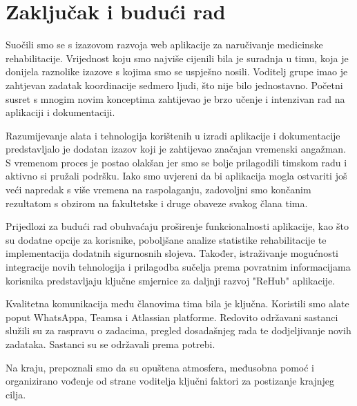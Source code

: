 \chapter{Zaključak i budući rad}
		
		Suočili smo se s izazovom razvoja web aplikacije za naručivanje medicinske rehabilitacije. Vrijednost koju smo najviše cijenili bila je suradnja u timu, koja je donijela raznolike izazove s kojima smo se uspješno nosili. Voditelj grupe imao je zahtjevan zadatak koordinacije sedmero ljudi, što nije bilo jednostavno. Početni susret s mnogim novim konceptima zahtijevao je brzo učenje i intenzivan rad na aplikaciji i dokumentaciji.

        Razumijevanje alata i tehnologija korištenih u izradi aplikacije i dokumentacije predstavljalo je dodatan izazov koji je zahtijevao značajan vremenski angažman. S vremenom proces je postao olakšan jer smo se bolje prilagodili timskom radu i aktivno si pružali podršku. Iako smo uvjereni da bi aplikacija mogla ostvariti još veći napredak s više vremena na raspolaganju, zadovoljni smo končanim rezultatom s obzirom na fakultetske i druge obaveze svakog člana tima.

        Prijedlozi za budući rad obuhvaćaju proširenje funkcionalnosti aplikacije, kao što su dodatne opcije za korisnike, poboljšane analize statistike rehabilitacije te implementacija dodatnih sigurnosnih slojeva. Također, istraživanje mogućnosti integracije novih tehnologija i prilagodba sučelja prema povratnim informacijama korisnika predstavljaju ključne smjernice za daljnji razvoj "ReHub" aplikacije.

        Kvalitetna komunikacija među članovima tima bila je ključna. Koristili smo alate poput WhatsAppa, Teamsa i Atlassian platforme. Redovito održavani sastanci služili su za raspravu o zadacima, pregled dosadašnjeg rada te dodjeljivanje novih zadataka. Sastanci su se održavali prema potrebi. 
        
        Na kraju, prepoznali smo da su opuštena atmosfera, međusobna pomoć i organizirano vođenje od strane voditelja ključni faktori za postizanje krajnjeg cilja.
        		
		\eject 